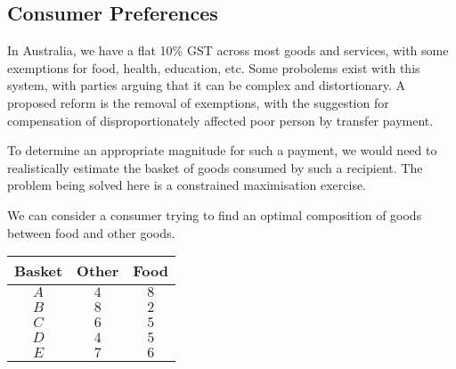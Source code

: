 \documentclass[12pt]{report}
\begin{document}
\begin{flushleft}
\subsection*{Consumer Preferences}
In Australia, we have a flat 10\% GST across most goods and services, with some
exemptions for food, health, education, etc. Some probolems exist with this
system, with parties arguing that it can be complex and distortionary. A
proposed reform is the removal of exemptions, with the suggestion for
compensation of disproportionately affected poor person by transfer payment.
\par
To determine an appropriate magnitude for such a payment, we would need to
realistically estimate the basket of goods consumed by such a recipient. The
problem being solved here is a constrained maximisation exercise. \par
We can consider a consumer trying to find an optimal composition of goods
between food and other goods.

\begin{center}    
    \begin{tabular}{c|c|c}
        Basket & Other & Food \\
        \hline
        \(A\) & \(4\) & \(8\) \\
        \(B\) & \(8\) & \(2\) \\
        \(C\) & \(6\) & \(5\) \\
        \(D\) & \(4\) & \(5\) \\
        \(E\) & \(7\) & \(6\) \\
    \end{tabular}
\end{center}


\end{flushleft}
\end{document}
